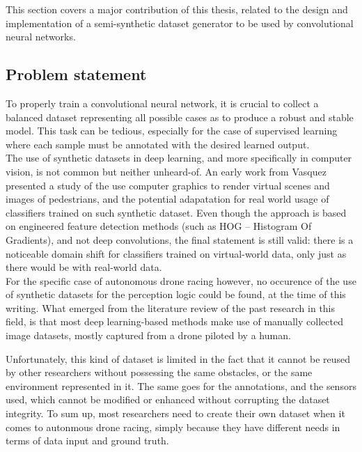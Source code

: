 This section covers a major contribution of this thesis, related to the design
and implementation of a semi-synthetic dataset generator to be used by
convolutional neural networks.

\subsection{Problem statement}

To properly train a convolutional neural network, it is crucial to collect a
balanced dataset representing all possible cases as to produce a robust and
stable model. This task can be tedious, especially for the case of supervised
learning where each sample must be annotated with the desired learned output.\\

The use of synthetic datasets in deep learning, and more specifically in
computer vision, is not common but neither unheard-of. An early work from
Vasquez \etal~\cite{PedestrianDetection} presented a study of the use computer
graphics to render virtual scenes and images of pedestrians, and the potential
adapatation for real world usage of classifiers trained on such synthetic
dataset. Even though the approach is based on engineered feature detection
methods (such as HOG -- Histogram Of Gradients), and not deep convolutions, the
final statement is still valid: there is a noticeable domain shift for
classifiers trained on virtual-world data, only just as there would be with
real-world data.\\


For the specific case of autonomous drone racing however, no occurence of the
use of synthetic datasets for the perception logic could be found, at the time
of this writing. What emerged from the literature review of the past research
in this field, is that most deep learning-based methods make use of manually
collected image datasets, mostly captured from a drone piloted by a human.

Unfortunately, this kind of dataset is limited in the fact that it cannot be
reused by other researchers without possessing the same obstacles, or the same
environment represented in it. The same goes for the annotations, and the
sensors used, which cannot be modified or enhanced without corrupting the
dataset integrity. To sum up, most researchers need to create their own dataset
when it comes to autonmous drone racing, simply because they have different
needs in terms of data input and ground truth.\\

